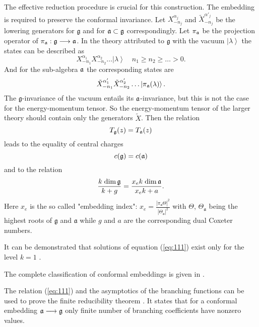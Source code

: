 The effective reduction procedure is crucial for this construction.
The embedding is required to preserve the conformal invariance.
Let $X^{\alpha_j}_{-n_j}$ and $\tilde{X}^{\alpha'_j}_{-n_j}$ be the lowering generators for
$\mathfrak{g}$ and for $\mathfrak{a}\subset\mathfrak{g}$ correspondingly.
Let $\pi_{\mathfrak{a}}$ be the projection operator of
$\pi_{\mathfrak{a}}:\mathfrak{g}\longrightarrow \mathfrak{a}$.
In the theory attributed to $\mathfrak{g}$ with the vacuum $\left|\lambda\right>$
the states can be described as
\begin{equation*}
  \label{eq:109}
  X^{\alpha_1}_{-n_1}X^{\alpha_2}_{-n_2}\dots\left|\lambda\right>\quad n_1\geq n_2\geq \dots>0.
\end{equation*}
And for the sub-algebra $\mathfrak{a}$ the corresponding states are
\begin{equation*}
  \label{eq:110}
  \tilde{X}^{\alpha'_1}_{-n_1}\tilde{X}^{\alpha'_2}_{-n_2}\dots\left|\pi_{\mathfrak{a}}(\lambda)\right>.
\end{equation*}
The $\mathfrak{g}$-invariance of the vacuum entails its $\mathfrak{a}$-invariance,
but this is not the case for the energy-momentum tensor. So the energy-momentum tensor of the larger theory
should contain only the generators $\tilde{X}$. Then the relation
\begin{equation}
  \label{eq:2}
  T_{\mathfrak{g}}(z)=T_{\mathfrak{a}}(z)
\end{equation}
leads to the equality of central charges
\begin{equation*}
  \label{eq:33}
  c(\mathfrak{g})=c(\mathfrak{a})
\end{equation*}
and to the relation
\begin{equation}
  \label{eq:111}
  \frac{k\;\mathrm{dim}\,\mathfrak{g}}{k+g}=\frac{x_e k\; \mathrm{dim}\,\mathfrak{a}}{x_ek+a}.
\end{equation}
Here $x_e$ is the so called "embedding index":
$x_e=\frac{\left|\pi_{\mathfrak{a}} \Theta\right|^2}{\left|\Theta_{\mathfrak{a}}\right|^2}$
with $\Theta$, $\Theta_{\mathfrak{a}}$ being the highest roots of
$\mathfrak{g}$ and $\mathfrak{a}$
while $g$  and $a$ are the  corresponding dual Coxeter numbers.

It can be demonstrated that solutions of equation (\ref{eq:111}) exist only
for the level $k=1$ \cite{difrancesco1997cft}.

The complete classification of conformal embeddings is given in \cite{schellekens1986conformal}.

The relation (\ref{eq:111}) and the asymptotics of the branching functions can be used
to prove the finite reducibility theorem \cite{kac1988modular}.
It states that for a conformal embedding  $\mathfrak{a}\longrightarrow\mathfrak{g}$
only finite number of branching coefficients have nonzero values.

